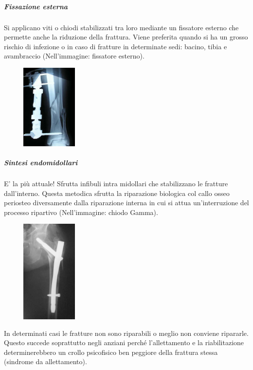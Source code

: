 \subparagraph{Fissazione esterna}
Si applicano viti o chiodi stabilizzati tra loro mediante un fissatore esterno che permette anche la riduzione della frattura. Viene preferita quando si ha un grosso rischio di infezione o in caso di fratture in determinate sedi: bacino, tibia e avambraccio (Nell'immagine: fissatore esterno).

\begin{figure}[!ht]
\centering
\includegraphics[width=0.25\textwidth]{001/image4.jpeg}
\end{figure}

\subparagraph{Sintesi endomidollari}
E' la più attuale! Sfrutta infibuli intra midollari che stabilizzano le fratture dall'interno. Questa metodica sfrutta la riparazione biologica col callo osseo periosteo diversamente dalla riparazione interna in cui si attua un'interruzione del processo ripartivo (Nell'immagine: chiodo Gamma).
  
\begin{figure}[!ht]
\centering
\includegraphics[width=0.25\textwidth]{001/image2.jpeg}
\end{figure}


In determinati casi le fratture non sono riparabili o meglio non conviene ripararle. Questo succede soprattutto negli anziani perché l'allettamento e la riabilitazione determinerebbero un crollo psicofisico ben peggiore della frattura stessa (sindrome da allettamento).


